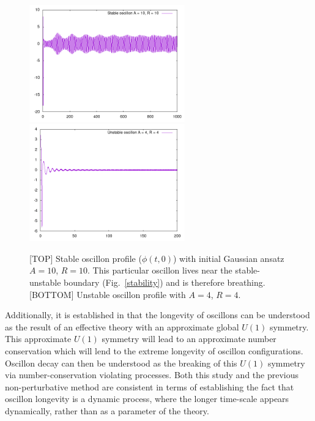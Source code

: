 \documentclass[11pt]{book}
\begin{document}
\begin{figure}\centering
  \includegraphics[width=0.6\textwidth]{plot/stable.png}\\
  \includegraphics[width=0.6\textwidth]{plot/unstable.png}
  \caption{[TOP] Stable oscillon profile ($\phi(t,0)$) with initial Gaussian ansatz $A = 10$, $R=10$. This particular oscillon lives near the stable-unstable boundary (Fig.~\ref{stability}) and is therefore breathing.
  [BOTTOM] Unstable oscillon profile with $A = 4$, $R = 4$.}
  \label{stableunstableprofiles}
\end{figure}

Additionally, it is established in \cite{Mukaida:2016hwd} that the longevity of oscillons can be understood as the result of an effective theory with an approximate global $U(1)$ symmetry. This approximate $U(1)$ symmetry will lead to an approximate number conservation which will lend to the extreme longevity of oscillon configurations. Oscillon decay can then be understood as the breaking of this $U(1)$ symmetry via number-conservation violating processes. Both this study and the previous non-perturbative method are consistent in terms of establishing the fact that oscillon longevity is a dynamic process, where the longer time-scale appears dynamically, rather than as a parameter of the theory.
\end{document}
